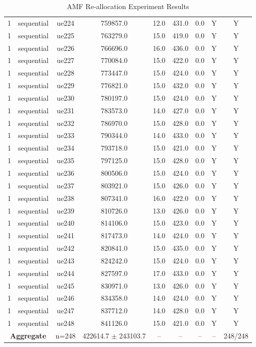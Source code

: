\begin{table}[ht]
\begin{tabular}{|c|c|c|c|c|c|c|c|c|}
1 & sequential & ue224 & 759857.0 & 12.0 & 431.0 & 0.0 & Y & Y \\
1 & sequential & ue225 & 763279.0 & 15.0 & 419.0 & 0.0 & Y & Y \\
1 & sequential & ue226 & 766696.0 & 16.0 & 436.0 & 0.0 & Y & Y \\
1 & sequential & ue227 & 770084.0 & 15.0 & 422.0 & 0.0 & Y & Y \\
1 & sequential & ue228 & 773447.0 & 15.0 & 424.0 & 0.0 & Y & Y \\
1 & sequential & ue229 & 776821.0 & 15.0 & 432.0 & 0.0 & Y & Y \\
1 & sequential & ue230 & 780197.0 & 15.0 & 424.0 & 0.0 & Y & Y \\
1 & sequential & ue231 & 783573.0 & 14.0 & 427.0 & 0.0 & Y & Y \\
1 & sequential & ue232 & 786970.0 & 15.0 & 428.0 & 0.0 & Y & Y \\
1 & sequential & ue233 & 790344.0 & 14.0 & 433.0 & 0.0 & Y & Y \\
1 & sequential & ue234 & 793718.0 & 15.0 & 421.0 & 0.0 & Y & Y \\
1 & sequential & ue235 & 797125.0 & 15.0 & 428.0 & 0.0 & Y & Y \\
1 & sequential & ue236 & 800506.0 & 15.0 & 424.0 & 0.0 & Y & Y \\
1 & sequential & ue237 & 803921.0 & 15.0 & 426.0 & 0.0 & Y & Y \\
1 & sequential & ue238 & 807341.0 & 16.0 & 422.0 & 0.0 & Y & Y \\
1 & sequential & ue239 & 810726.0 & 13.0 & 426.0 & 0.0 & Y & Y \\
1 & sequential & ue240 & 814106.0 & 15.0 & 423.0 & 0.0 & Y & Y \\
1 & sequential & ue241 & 817473.0 & 14.0 & 424.0 & 0.0 & Y & Y \\
1 & sequential & ue242 & 820841.0 & 15.0 & 435.0 & 0.0 & Y & Y \\
1 & sequential & ue243 & 824242.0 & 15.0 & 424.0 & 0.0 & Y & Y \\
1 & sequential & ue244 & 827597.0 & 17.0 & 433.0 & 0.0 & Y & Y \\
1 & sequential & ue245 & 830971.0 & 13.0 & 426.0 & 0.0 & Y & Y \\
1 & sequential & ue246 & 834358.0 & 14.0 & 424.0 & 0.0 & Y & Y \\
1 & sequential & ue247 & 837712.0 & 14.0 & 428.0 & 0.0 & Y & Y \\
1 & sequential & ue248 & 841126.0 & 15.0 & 421.0 & 0.0 & Y & Y \\
\multicolumn{2}{|c|}{\textbf{Aggregate}} & n=248 & 422614.7 $\pm$ 243103.7 & -- & -- & -- & -- & 248/248 \\
\hline
\end{tabular}
\caption{AMF Re-allocation Experiment Results}
\label{tab:amf_realloc}
\end{table}
